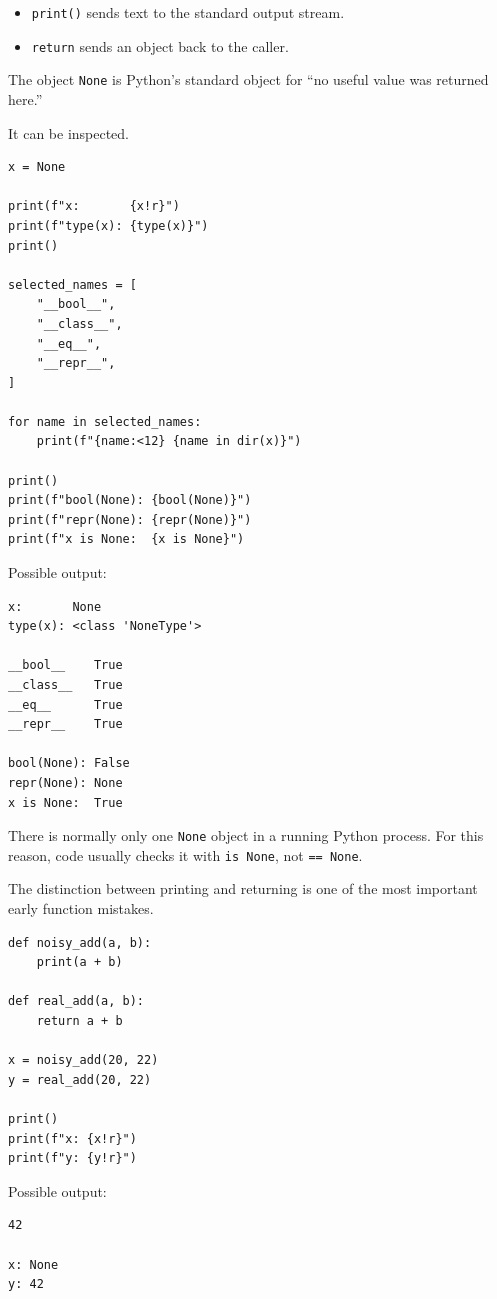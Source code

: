 \begin{itemize}
    \item \texttt{print()} sends text to the standard output stream.
    \item \texttt{return} sends an object back to the caller.
\end{itemize}

The object \texttt{None} is Python's standard object for ``no useful value was returned here.''

It can be inspected.

\begin{verbatim}
x = None

print(f"x:       {x!r}")
print(f"type(x): {type(x)}")
print()

selected_names = [
    "__bool__",
    "__class__",
    "__eq__",
    "__repr__",
]

for name in selected_names:
    print(f"{name:<12} {name in dir(x)}")

print()
print(f"bool(None): {bool(None)}")
print(f"repr(None): {repr(None)}")
print(f"x is None:  {x is None}")
\end{verbatim}

Possible output:

\begin{verbatim}
x:       None
type(x): <class 'NoneType'>

__bool__    True
__class__   True
__eq__      True
__repr__    True

bool(None): False
repr(None): None
x is None:  True
\end{verbatim}

There is normally only one \texttt{None} object in a running Python process. For this reason, code usually checks it with \texttt{is None}, not \texttt{== None}.

The distinction between printing and returning is one of the most important early function mistakes.

\begin{verbatim}
def noisy_add(a, b):
    print(a + b)

def real_add(a, b):
    return a + b

x = noisy_add(20, 22)
y = real_add(20, 22)

print()
print(f"x: {x!r}")
print(f"y: {y!r}")
\end{verbatim}

Possible output:

\begin{verbatim}
42

x: None
y: 42
\end{verbatim}

